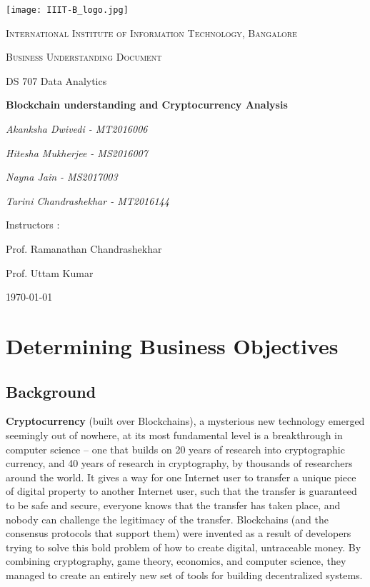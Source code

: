 \documentclass{article}
\begin{document}
\begin{titlepage}
	\centering
	\texttt{[image: IIIT-B\_logo.jpg]}\par\vspace{1cm}
	{\scshape\LARGE International Institute of Information Technology, Bangalore \par}
	\vspace{1cm}
	{\scshape\Large Business Understanding Document\par}
	{\Large DS 707 Data Analytics\par}
	\vspace{1.5cm}
	{\huge\bfseries Blockchain understanding and Cryptocurrency Analysis\par}
	\vspace{2cm}
	{\Large\itshape Akanksha Dwivedi - MT2016006\par}
	{\Large\itshape Hitesha Mukherjee - MS2016007\par}
	{\Large\itshape Nayna Jain - MS2017003\par}
	{\Large\itshape Tarini Chandrashekhar - MT2016144\par}
	\vfill
	Instructors : \par
	Prof. Ramanathan Chandrashekhar
	\par
	Prof. Uttam Kumar

	\vfill

	{\large \today\par}
\end{titlepage}

\newpage

\tableofcontents


\newpage
\justify
\section{Determining Business Objectives}
\subsection{Background}
\textbf{Cryptocurrency} (built over Blockchains), a mysterious new technology emerged seemingly out of nowhere, at its most fundamental level is a breakthrough in computer science – one that builds on 20 years of research into cryptographic currency, and 40 years of research in cryptography, by thousands of researchers around the world. It gives a way for one Internet user to transfer a unique piece of digital property to another Internet user, such that the transfer is guaranteed to be safe and secure, everyone knows that the transfer has taken place, and nobody can challenge the legitimacy of the transfer.
\newline
Blockchains (and the consensus protocols that support them) were invented as a result of developers trying to solve this bold problem of how to create digital, untraceable money. By combining cryptography, game theory, economics, and computer science, they managed to create an entirely new set of tools for building decentralized systems.
\end{document}
